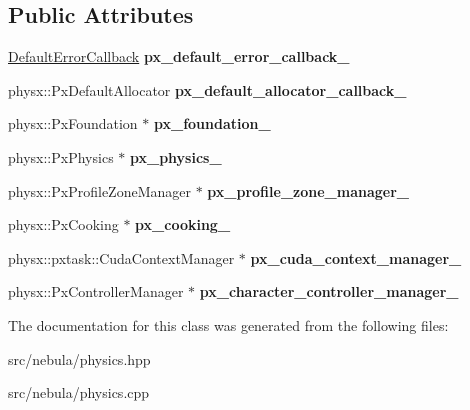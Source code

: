 \subsection*{\-Public \-Attributes}
\begin{DoxyCompactItemize}
\item 
\hypertarget{classneb_1_1physics_a819d98df4d7357116516e0f2df0e34fc}{\hyperlink{classDefaultErrorCallback}{\-Default\-Error\-Callback} {\bfseries px\-\_\-default\-\_\-error\-\_\-callback\-\_\-}}\label{classneb_1_1physics_a819d98df4d7357116516e0f2df0e34fc}

\item 
\hypertarget{classneb_1_1physics_a63bea60198e1c6460c104fdd38ab2018}{physx\-::\-Px\-Default\-Allocator {\bfseries px\-\_\-default\-\_\-allocator\-\_\-callback\-\_\-}}\label{classneb_1_1physics_a63bea60198e1c6460c104fdd38ab2018}

\item 
\hypertarget{classneb_1_1physics_ab6ad04fa0dd429d2e43808dbe4ff6874}{physx\-::\-Px\-Foundation $\ast$ {\bfseries px\-\_\-foundation\-\_\-}}\label{classneb_1_1physics_ab6ad04fa0dd429d2e43808dbe4ff6874}

\item 
\hypertarget{classneb_1_1physics_afc65796d459735ca9e946582934f57ad}{physx\-::\-Px\-Physics $\ast$ {\bfseries px\-\_\-physics\-\_\-}}\label{classneb_1_1physics_afc65796d459735ca9e946582934f57ad}

\item 
\hypertarget{classneb_1_1physics_a727d7d7cb92e32a99d3b3463993f989f}{physx\-::\-Px\-Profile\-Zone\-Manager $\ast$ {\bfseries px\-\_\-profile\-\_\-zone\-\_\-manager\-\_\-}}\label{classneb_1_1physics_a727d7d7cb92e32a99d3b3463993f989f}

\item 
\hypertarget{classneb_1_1physics_ab12401759700525d86a7219d6c649e7b}{physx\-::\-Px\-Cooking $\ast$ {\bfseries px\-\_\-cooking\-\_\-}}\label{classneb_1_1physics_ab12401759700525d86a7219d6c649e7b}

\item 
\hypertarget{classneb_1_1physics_aa7129bf5f326d56721c401780fab8613}{physx\-::pxtask\-::\-Cuda\-Context\-Manager $\ast$ {\bfseries px\-\_\-cuda\-\_\-context\-\_\-manager\-\_\-}}\label{classneb_1_1physics_aa7129bf5f326d56721c401780fab8613}

\item 
\hypertarget{classneb_1_1physics_ab736a4b3ffe77be9ef6be2ea128fcaf8}{physx\-::\-Px\-Controller\-Manager $\ast$ {\bfseries px\-\_\-character\-\_\-controller\-\_\-manager\-\_\-}}\label{classneb_1_1physics_ab736a4b3ffe77be9ef6be2ea128fcaf8}

\end{DoxyCompactItemize}


\-The documentation for this class was generated from the following files\-:\begin{DoxyCompactItemize}
\item 
src/nebula/physics.\-hpp\item 
src/nebula/physics.\-cpp\end{DoxyCompactItemize}
